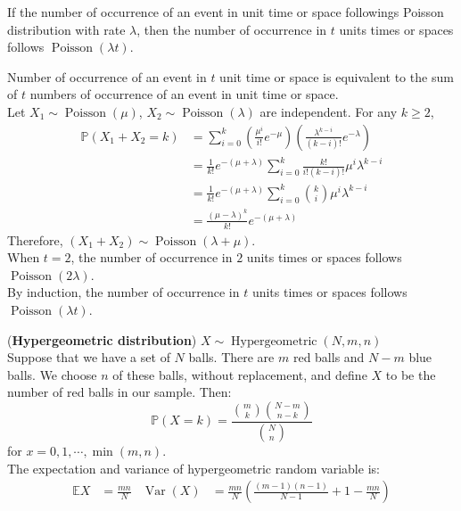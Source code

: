 \documentclass{huhtakm-template-book}
\newcommand{\prob}{\mathbb{P}}
\newcommand{\expect}{\mathbb{E}}
\DeclareMathOperator{\Poisson}{Poisson}
\DeclareMathOperator{\Hypergeometric}{Hypergeometric}
\DeclareMathOperator{\Var}{Var}
\begin{document}
\newpage
\begin{thm}
	If the number of occurrence of an event in unit time or space followings Poisson distribution with rate $\lambda$, then the number of occurrence in $t$ units times or spaces follows $\Poisson(\lambda t)$.
\end{thm}
\begin{proofing}
	Number of occurrence of an event in $t$ unit time or space is equivalent to the sum of $t$ numbers of occurrence of an event in unit time or space.\\
	Let $X_{1}\sim\Poisson(\mu)$, $X_{2}\sim\Poisson(\lambda)$ are independent. For any $k\geq 2$,
	\begin{align*}
		\prob(X_{1}+X_{2}=k)&=\sum_{i=0}^{k}\left(\frac{\mu^{i}}{i!}e^{-\mu}\right)\left(\frac{\lambda^{k-i}}{(k-i)!}e^{-\lambda}\right)\\
		&=\frac{1}{k!}e^{-(\mu+\lambda)}\sum_{i=0}^{k}\frac{k!}{i!(k-i)!}\mu^{i}\lambda^{k-i}\\
		&=\frac{1}{k!}e^{-(\mu+\lambda)}\sum_{i=0}^{k}\binom{k}{i}\mu^{i}\lambda^{k-i}\\
		&=\frac{(\mu-\lambda)^{k}}{k!}e^{-(\mu+\lambda)}
	\end{align*}
	Therefore, $(X_{1}+X_{2})\sim\Poisson(\lambda+\mu)$.\\
	When $t=2$, the number of occurrence in $2$ units times or spaces follows $\Poisson(2\lambda)$.\\
	By induction, the number of occurrence in $t$ units times or spaces follows $\Poisson(\lambda t)$.
\end{proofing}
\begin{eg}(\textbf{Hypergeometric distribution}) $X\sim\Hypergeometric(N,m,n)$\\
	Suppose that we have a set of $N$ balls. There are $m$ red balls and $N-m$ blue balls. We choose $n$ of these balls, without replacement, and define $X$ to be the number of red balls in our sample. Then:
	\begin{equation*}
		\prob(X=k)=\frac{\binom{m}{k}\binom{N-m}{n-k}}{\binom{N}{n}}
	\end{equation*}
	for $x=0,1,\cdots,\min(m,n)$.\\
	The expectation and variance of hypergeometric random variable is:
	\begin{align*}
		\expect{X}&=\frac{mn}{N} & \Var(X)&=\frac{mn}{N}\left(\frac{(m-1)(n-1)}{N-1}+1-\frac{mn}{N}\right)
	\end{align*}
\end{eg}
\end{document}
